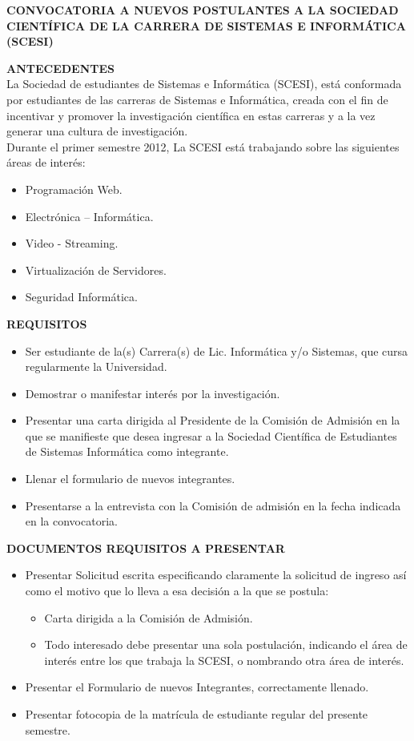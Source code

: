 \documentclass[11pt,letterpaper]{report}
\newcommand\BackgroundPic{
\put(485,727){
\parbox[b][\paperheight]{\paperwidth}{%
\texttt{[image: img/logo3.png]}%
}}}
\begin{document}
\AddToShipoutPicture{\BackgroundPic}
\begin{center}
{\bf \Large CONVOCATORIA A NUEVOS POSTULANTES A LA SOCIEDAD CIENTÍFICA DE LA CARRERA DE SISTEMAS E INFORMÁTICA
(SCESI)}\\
\end{center}

{\bf \small ANTECEDENTES}\\

La Sociedad de estudiantes de Sistemas e Informática (SCESI), está conformada por estudiantes de las carreras de Sistemas e Informática, creada con el fin de incentivar y promover la investigación científica en estas carreras y a la vez generar una cultura de investigación.\\

Durante el primer semestre 2012, La SCESI está trabajando sobre las siguientes áreas de interés:
\begin{itemize}
\item Programación Web.
\item Electrónica – Informática.
\item Video - Streaming.
\item Virtualización de Servidores.
\item Seguridad Informática.
\end{itemize}

{\bf \small REQUISITOS}
\begin{itemize}
\item[a.] Ser estudiante de la(s) Carrera(s) de Lic. Informática y/o Sistemas, que cursa regularmente la Universidad.
\item[b.] Demostrar o manifestar interés por la investigación.
\item[c.] Presentar una carta dirigida al Presidente de la Comisión de Admisión en la que se manifieste que desea ingresar a la Sociedad Científica de Estudiantes de Sistemas Informática como integrante.
\item[d.] Llenar el formulario de nuevos integrantes.
\item[e.] Presentarse a la entrevista con la Comisión de admisión en la fecha indicada en la convocatoria.
\end{itemize}

{\bf \small DOCUMENTOS REQUISITOS A PRESENTAR}
\begin{itemize}
\item[a.] Presentar Solicitud escrita especificando claramente la solicitud de ingreso así como el motivo que lo lleva a esa decisión a la que se postula:
\begin{itemize}
\item Carta dirigida a la Comisión de Admisión.
\item Todo interesado debe presentar una sola postulación, indicando el área de interés entre los que  trabaja la SCESI, o nombrando otra área de interés.
\end{itemize}
\item[b.] Presentar el Formulario de nuevos Integrantes, correctamente llenado.
\item[c.] Presentar fotocopia de la matrícula de estudiante regular del presente semestre.
\end{itemize}
\end{document}
